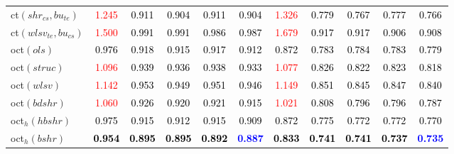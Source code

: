 \begin{tabular}[t]{l|>{}cccc>{}c|ccccc}
ct$(shr_{cs}, bu_{te})$ & \textcolor{red}{1.245} & \textcolor{black}{0.911} & \textcolor{black}{0.904} & \textcolor{black}{0.911} & \textcolor{black}{0.904} & \textcolor{red}{1.326} & \textcolor{black}{0.779} & \textcolor{black}{0.767} & \textcolor{black}{0.777} & \textcolor{black}{0.766}\\
ct$(wlsv_{te}, bu_{cs})$ & \textcolor{red}{1.500} & \textcolor{black}{0.991} & \textcolor{black}{0.991} & \textcolor{black}{0.986} & \textcolor{black}{0.987} & \textcolor{red}{1.679} & \textcolor{black}{0.917} & \textcolor{black}{0.917} & \textcolor{black}{0.906} & \textcolor{black}{0.908}\\
oct$(ols)$ & \textcolor{black}{0.976} & \textcolor{black}{0.918} & \textcolor{black}{0.915} & \textcolor{black}{0.917} & \textcolor{black}{0.912} & \textcolor{black}{0.872} & \textcolor{black}{0.783} & \textcolor{black}{0.784} & \textcolor{black}{0.783} & \textcolor{black}{0.779}\\
oct$(struc)$ & \textcolor{red}{1.096} & \textcolor{black}{0.939} & \textcolor{black}{0.936} & \textcolor{black}{0.938} & \textcolor{black}{0.933} & \textcolor{red}{1.077} & \textcolor{black}{0.826} & \textcolor{black}{0.822} & \textcolor{black}{0.823} & \textcolor{black}{0.818}\\
oct$(wlsv)$ & \textcolor{red}{1.142} & \textcolor{black}{0.953} & \textcolor{black}{0.949} & \textcolor{black}{0.951} & \textcolor{black}{0.946} & \textcolor{red}{1.149} & \textcolor{black}{0.851} & \textcolor{black}{0.845} & \textcolor{black}{0.847} & \textcolor{black}{0.840}\\
oct$(bdshr)$ & \textcolor{red}{1.060} & \textcolor{black}{0.926} & \textcolor{black}{0.920} & \textcolor{black}{0.921} & \textcolor{black}{0.915} & \textcolor{red}{1.021} & \textcolor{black}{0.808} & \textcolor{black}{0.796} & \textcolor{black}{0.796} & \textcolor{black}{0.787}\\
oct$_h(hbshr)$ & \textcolor{black}{0.975} & \textcolor{black}{0.915} & \textcolor{black}{0.912} & \textcolor{black}{0.915} & \textcolor{black}{0.909} & \textcolor{black}{0.872} & \textcolor{black}{0.775} & \textcolor{black}{0.772} & \textcolor{black}{0.772} & \textcolor{black}{0.770}\\
oct$_h(bshr)$ & \textcolor{black}{\textbf{0.954}} & \textcolor{black}{\textbf{0.895}} & \textcolor{black}{\textbf{0.895}} & \textcolor{black}{\textbf{0.892}} & \textcolor{blue}{\textbf{0.887}} & \textcolor{black}{\textbf{0.833}} & \textcolor{black}{\textbf{0.741}} & \textcolor{black}{\textbf{0.741}} & \textcolor{black}{\textbf{0.737}} & \textcolor{blue}{\textbf{0.735}}\\

\end{tabular}
